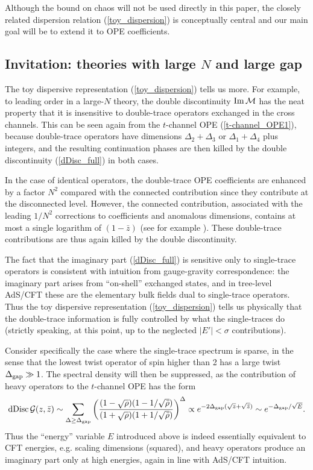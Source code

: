 \documentclass[11pt, reqno,preprint]{article}
\def\be{\begin{equation}}
\def\ee{\end{equation}}
\def\dDisc{{\rm dDisc}\,}
\def\rhobar{\bar{\rho}}
\def\zbar{\bar{z}}
\def\GG{\mathcal{G}}
\begin{document}
Although the bound on chaos will not be used directly in this paper, the closely related dispersion relation
(\ref{toy_dispersion}) is conceptually central and our main goal will be to extend it to OPE coefficients.

\subsection{Invitation: theories with large $N$ and large gap}\label{ssec:largeN}

The toy dispersive representation (\ref{toy_dispersion}) tells us more.
For example, to leading order in a large-$N$ theory, the double discontinuity $\rm Im\,\mathcal{M}$
has the neat property that it is insensitive to double-trace operators exchanged in the cross channels.
This can be seen again from the $t$-channel OPE (\ref{t-channel_OPE1}), because double-trace operators
have dimensions $\Delta_2+\Delta_3$ or $\Delta_1+\Delta_4$ plus integers,
and the resulting continuation phases are then killed by the double discontinuity (\ref{dDisc_full}) in both cases.

In the case of identical operators,
the double-trace OPE coefficients are enhanced by a factor $N^2$ compared with the connected contribution since they contribute
at the disconnected level.
However, the connected contribution, associated with the leading $1/N^2$ corrections to coefficients and anomalous dimensions,
contains at most a single logarithm of $(1-\zbar)$ (see for example \cite{Heemskerk:2009pn}).
These double-trace contributions are thus again killed by the double discontinuity.

The fact that the imaginary part (\ref{dDisc_full}) is sensitive only to single-trace operators
is consistent with intuition from gauge-gravity correspondence: the imaginary part arises from
``on-shell'' exchanged states, and in tree-level AdS/CFT these are the elementary bulk fields dual to single-trace operators.
Thus the toy dispersive representation (\ref{toy_dispersion}) tells us physically that the double-trace information
is fully controlled by what the single-traces do (strictly speaking, at this point, up to the neglected $|E'|<\sigma$ contributions).

Consider specifically the case where the single-trace spectrum is sparse, in the sense
that the lowest twist operator of spin higher than 2 has a large twist $\Delta_{\rm gap}\gg 1$.
The spectral density will then be suppressed, as the contribution of heavy operators to the $t$-channel OPE has the form
\be \label{heavy_contribution}
\dDisc \GG(z,\zbar)\sim
\sum_{\Delta\geq \Delta_{\rm gap}} \left(\frac{(1-\sqrt{\rho})(1-1/\sqrt{\rhobar})}{(1+\sqrt{\rho})(1+1/\sqrt{\rhobar})}\right)^{\Delta}\propto 
 e^{-2\Delta_{\rm gap}(\sqrt{z}+\sqrt{\zbar})} \sim e^{-\Delta_{\rm gap}/\sqrt{E}}.
\ee
Thus the ``energy'' variable $E$ introduced above is indeed essentially equivalent to CFT energies, e.g. scaling dimensions (squared),
and heavy operators produce an imaginary part only at high energies, again in line with AdS/CFT intuition.
\end{document}
